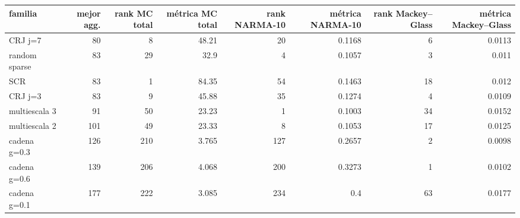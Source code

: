 \begin{tabular}{lrrrrrrr}
\toprule
familia & mejor agg. & rank MC total & métrica MC total & rank NARMA-10 & métrica NARMA-10 & rank Mackey–Glass & métrica Mackey–Glass \\
\midrule
CRJ j=7 & 80 & 8 & 48.21 & 20 & 0.1168 & 6 & 0.0113 \\
random sparse & 83 & 29 & 32.9 & 4 & 0.1057 & 3 & 0.011 \\
SCR & 83 & 1 & 84.35 & 54 & 0.1463 & 18 & 0.012 \\
CRJ j=3 & 83 & 9 & 45.88 & 35 & 0.1274 & 4 & 0.0109 \\
multiescala 3 & 91 & 50 & 23.23 & 1 & 0.1003 & 34 & 0.0152 \\
multiescala 2 & 101 & 49 & 23.33 & 8 & 0.1053 & 17 & 0.0125 \\
cadena g=0.3 & 126 & 210 & 3.765 & 127 & 0.2657 & 2 & 0.0098 \\
cadena g=0.6 & 139 & 206 & 4.068 & 200 & 0.3273 & 1 & 0.0102 \\
cadena g=0.1 & 177 & 222 & 3.085 & 234 & 0.4 & 63 & 0.0177 \\
\bottomrule
\end{tabular}
